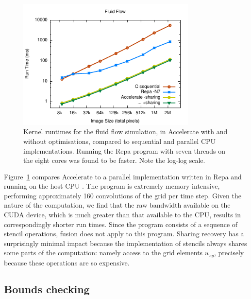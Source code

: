 \begin{figure}
    \begin{center}
        \includegraphics[width=0.8\textwidth]{images/sec-6/fluid/fluid}
    \end{center}
    \caption[Fluid flow simulation kernel benchmarks]{Kernel runtimes for the
        fluid flow simulation, in Accelerate with and without optimisations,
        compared to sequential and parallel CPU implementations. Running the
        Repa program with seven threads on the eight cores was found to be
        faster. Note the log-log scale.
        }
    \label{fig:fluid}
\end{figure}

Figure~\ref{fig:fluid} compares Accelerate to a parallel implementation written
in Repa and running on the host CPU \cite{Lippmeier:2012gx}. The program is
extremely memory intensive, performing approximately 160 convolutions of the
grid per time step. Given the nature of the computation, we find that the raw
bandwidth available on the CUDA device, which is much greater than that
available to the CPU, results in correspondingly shorter run times. Since the
program consists of a sequence of stencil operations, fusion does not apply to
this program. Sharing recovery has a surprisingly minimal impact because the
implementation of stencils always shares some parts of the computation: namely
access to the grid elements $u_{xy}$, precisely because these operations are so
expensive.

\subsection{Bounds checking}
\label{sec:stencil_bounds_checking}

